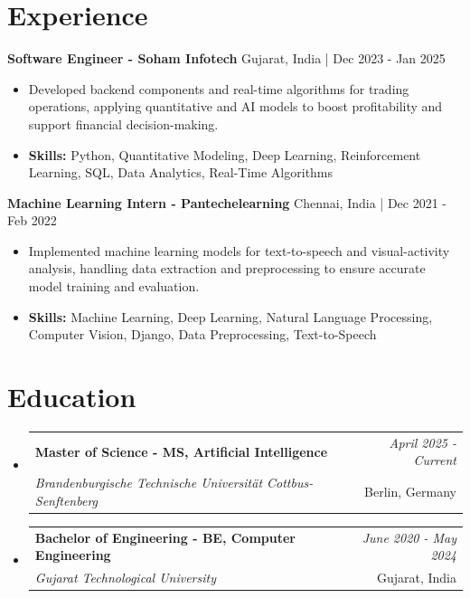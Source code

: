\documentclass[a4paper,11pt]{article}
\makeatletter
\newcommand{\resumeSubheading}[4]{
\vspace{0.5mm}\item
    \begin{tabular*}{\linewidth}[t]{l@{\extracolsep{\fill}}r}
        \textbf{#1} & \textit{\footnotesize{#4}} \\
        \textit{\footnotesize{#3}} &  \footnotesize{#2}\\
    \end{tabular*}
    \vspace{-2.4mm}
}
\makeatother
\begin{document}
\section{\textbf{Experience}}


\vspace{1mm}
  \textbf{Software Engineer - Soham Infotech} \hfill Gujarat, India | Dec 2023 - Jan 2025
\vspace{-1.5mm} %
\begin{itemize}
  \item Developed backend components and real-time algorithms for trading operations, applying quantitative and AI models to boost profitability and support financial decision-making.

\vspace{-2mm}
  \item \textbf{Skills:} Python, Quantitative Modeling, Deep Learning, Reinforcement Learning, SQL, Data Analytics, Real-Time Algorithms
\end{itemize}

\vspace{1mm}
  \textbf{Machine Learning Intern - Pantechelearning} \hfill Chennai, India | Dec 2021 - Feb 2022
\vspace{-1.5mm} %
\begin{itemize}
  \item Implemented machine learning models for text-to-speech and visual-activity analysis, handling data extraction and preprocessing to ensure accurate model training and evaluation.
\vspace{-2mm}
  \item \textbf{Skills:} Machine Learning, Deep Learning, Natural Language Processing, Computer Vision, Django, Data Preprocessing, Text-to-Speech
\end{itemize}\section{\textbf{Education}}
\vspace{-0.4mm}

\begin{itemize}[leftmargin=0.15in, label={}]
\resumeSubheading
{Master of Science - MS, Artificial Intelligence }{Berlin, Germany}
{Brandenburgische Technische Universität Cottbus-Senftenberg  }{April 2025 - Current}

\vspace{1.0mm} %
\resumeSubheading
{Bachelor of Engineering - BE, Computer Engineering  }{Gujarat, India}
{Gujarat Technological University }{June 2020 - May 2024}

\end{itemize}
\end{document}

